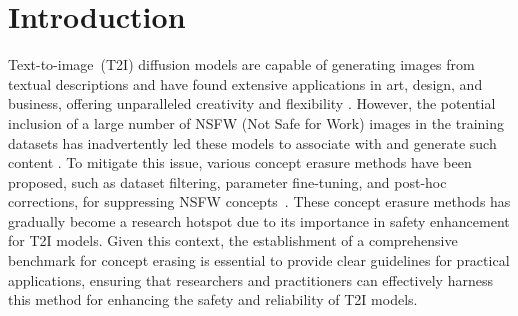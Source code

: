 \section{Introduction}
Text-to-image~(T2I) diffusion models \cite{t2i1,alexander2022glide} are capable of generating images from textual descriptions and have found extensive applications in art, design, and business, offering unparalleled creativity and flexibility \cite{t2ieffect1}. However, the potential inclusion of a large number of NSFW (Not Safe for Work) images in the training datasets \cite{schuhmann2022laion5b,rombach2022high} has inadvertently led these models to associate with and generate such content \cite{deepfake,ai-pimping}.
To mitigate this issue, various concept erasure methods have been proposed, such as dataset filtering, parameter fine-tuning, and post-hoc corrections, for suppressing NSFW concepts~\cite{patrick2023safe,gandikota2023erasing-esd,lyu2024one-spm,gandikota2024unified-uce,zhang2024defensive-au,lu2024mace,kumari2023ablating-ca,zhang2024forget-fmn,li2024self-selfd,fan2023salun}. 
These concept erasure methods has gradually become a research hotspot due to its importance in safety enhancement for T2I models. 
Given this context, the establishment of a comprehensive benchmark for concept erasing is essential to provide clear guidelines for practical applications, ensuring that researchers and practitioners can effectively harness this method for enhancing the safety and reliability of T2I models.

